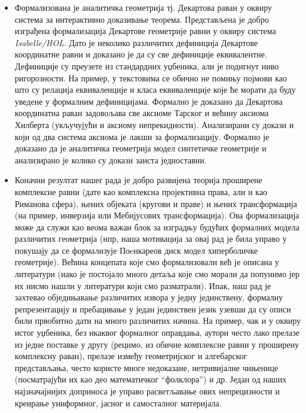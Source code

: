 \begin{itemize}
\item Формализована је аналитичка геометрија тј. Декартова раван у
  оквиру система за интерактивно доказивање теорема. Пре\-дста\-вљена
  је добро изграђена формализација Декартове геометрије равни у оквиру
  система \emph{Isabelle/HOL}. Дато је неколико различитих дефиниција
  Декартове координатне равни и доказано је да су све дефиниције
  еквивалентне. Дефиниције су преузете из стандардних уџбеника, али је
  подигнут ниво ригорозности.  На пример, у текстовима се обично не
  помињу појмови као што су релација еквиваленције и класа
  еквиваленције које ће морати да буду уведене у формалним
  дефиницијама. Формално је доказано да Декартова координатна раван
  задовољава све аксиоме Тарског и већину аксиома Хилберта (укључујући
  и аксиому непрекидности). Анализирани су докази и који од два
  система аксиома је лакши за формализацију. Формално је доказано да
  је аналитичка геометрија модел синтетичке геометрије и анализирано
  је колико су докази заиста једноставни.

\item Коначни резултат нашег рада је добро развијена теорија проширене
  комплексне равни (дате као комплексна пројективна права, али и као
  Риманова сфера), њених објеката (кругови и праве) и њених
  трансформација (на пример, инверзија или Мебијусових
  трансформација). Ова формализација може да служи као веома важан
  блок за изградњу будућих формалних модела различитих геометрија
  (нпр, наша мотивација за овај рад је била управо у покушају да се
  формализује Поeнкареов диск модел хиперболичке геометрије). Већина
  концепата које смо формализовали већ је описана у литератури (иако
  је постојало много детаља које смо морали да попунимо јер их нисмо
  нашли у литератури који смо разматрали). Ипак, наш рад је захтевао
  обједињавање различитих извора у једну јединствену, формалну
  репрезентацију и пребацивање у један јединствен језик узевши да су
  описи били првобитно дати на много различитих начина. На пример, чак
  и у оквиру истог уџбеника, без икаквог формалног оправдања, аутори
  често лако прелазе из једне поставке у другу (рецимо, из обичне
  комплексне равни у проширену комплексну раван), прелазе између
  геометријског и алгебарског представљања, често користе многе
  недоказане, нетривијалне чињенице (посматрајући их као део
  математичког ``фолклора'') и др. Један од наших најзначајнијих
  доприноса је управо расветљавање ових непрецизности и креирање
  униформног, јасног и самосталног материјала.


\end{itemize}
